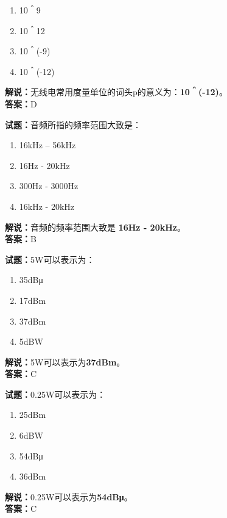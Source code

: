 \documentclass{ctexbook}
\begin{document}
\begin{enumerate}[leftmargin=3em]
	\item 10＾9
	\item 10＾12
	\item 10＾(-9)
	\item 10＾(-12)
\end{enumerate}

\noindent\textbf{解说：}无线电常用度量单位的词头p的意义为：\textbf{10＾(-12)}。\\\noindent\textbf{答案：}D


\bigskip


\noindent\textbf{试题：}音频所指的频率范围大致是：

\begin{enumerate}[leftmargin=3em]
	\item 16kHz – 56kHz
	\item 16Hz - 20kHz
	\item 300Hz - 3000Hz
	\item 16kHz - 20kHz
\end{enumerate}

\noindent\textbf{解说：}音频的频率范围大致是 \textbf{16Hz - 20kHz}。\\\noindent\textbf{答案：}B %


\bigskip


\noindent\textbf{试题：}5W可以表示为：

\begin{enumerate}[leftmargin=3em]
	\item 35dBμ
	\item 17dBm
	\item 37dBm
	\item 5dBW
\end{enumerate}

\noindent\textbf{解说：}5W可以表示为\textbf{37dBm}。\\\noindent\textbf{答案：}C %


\bigskip


\noindent\textbf{试题：}0.25W可以表示为：

\begin{enumerate}[leftmargin=3em]
	\item 25dBm
	\item 6dBW
	\item 54dBμ
	\item 36dBm
\end{enumerate}

\noindent\textbf{解说：}0.25W可以表示为\textbf{54dBμ}。\\\noindent\textbf{答案：}C%
\end{document}
